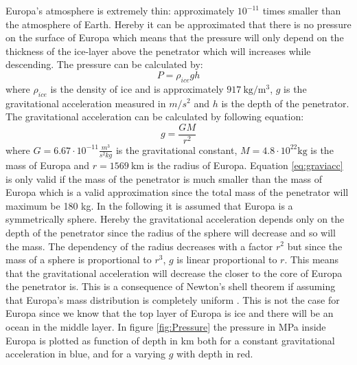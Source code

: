 \label{sec:Pressure}
Europa's atmosphere is extremely thin: approximately $10^{-11}$ times smaller than the atmosphere of Earth\cite{hall1995a}. Hereby it can be approximated that there is no pressure on the surface of Europa which means that the pressure will only depend on the thickness of the ice-layer above the penetrator which will increases while descending. The pressure can be calculated by: 
\begin{equation}
P = \rho_{ice} g h
\end{equation}
where $\rho_{ice}$ is the density of ice and is approximately $\SI{917}{\kilo\gram\per\cubic\metre}$\cite{cutnell2007a}, $g$ is the gravitational acceleration measured in $m/s^2$ and $h$ is the depth of the penetrator. The gravitational acceleration can be calculated by following equation:
\begin{equation}\label{eq:graviacc}
g = \frac{GM}{r^2}
\end{equation} 
where $G = 6.67\cdot 10^{-11}\frac{m^3}{s^2 kg}$ is the gravitational constant, $M = 4.8\cdot 10^{22}\text{kg}$ is the mass of Europa and $r = \SI{1569}{\km}$ is the radius of Europa\cite{website:propeuropa}. Equation \ref{eq:graviacc} is only valid if the mass of the penetrator is much smaller than the mass of Europa which is a valid approximation since the total mass of the penetrator will maximum be 180 kg. In the following it is assumed that Europa is a symmetrically sphere. Hereby the gravitational acceleration depends only on the depth of the penetrator since the radius of the sphere will decrease and so will the mass. The dependency of the radius decreases with a factor $r^2$ but since the mass of a sphere is proportional to $r^3$, $g$ is linear proportional to $r$. This means that the gravitational acceleration will decrease the closer to the core of Europa the penetrator is. This is a consequence of Newton's shell theorem if assuming that Europa's mass distribution is completely uniform \cite{website:shelltheorem}. This is not the case for Europa since we know that the top layer of Europa is ice and there will be an ocean in the middle layer. In figure \ref{fig:Pressure} the pressure in MPa inside Europa is plotted as function of depth in km both for a constant gravitational acceleration in blue, and for a varying $g$ with depth in red.  

